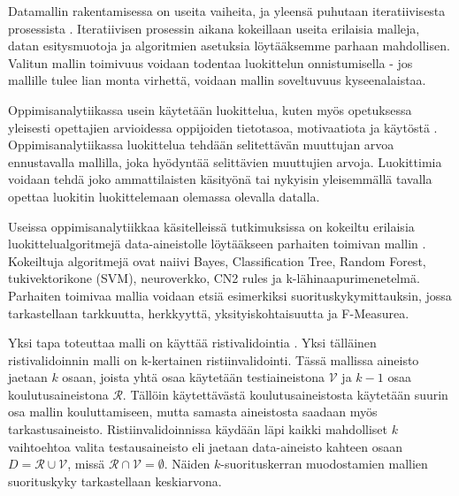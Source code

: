 Datamallin rakentamisessa on useita vaiheita, ja yleensä puhutaan iteratiivisesta prosessista \citep{hamalainenClassifiersEducationalData2010}. Iteratiivisen prosessin aikana kokeillaan useita erilaisia malleja, datan esitysmuotoja ja algoritmien asetuksia löytääksemme parhaan mahdollisen. Valitun mallin toimivuus voidaan todentaa luokittelun onnistumisella - jos mallille tulee lian monta virhettä, voidaan mallin soveltuvuus kyseenalaistaa.

Oppimisanalytiikassa usein käytetään luokittelua, kuten myös opetuksessa yleisesti opettajien arvioidessa oppijoiden tietotasoa, motivaatiota ja käytöstä \citep{hamalainenClassifiersEducationalData2010}. Oppimisanalytiikassa luokittelua tehdään selitettävän muuttujan arvoa ennustavalla mallilla, joka hyödyntää selittävien muuttujien arvoja. Luokittimia voidaan tehdä joko ammattilaisten käsityönä tai nykyisin yleisemmällä tavalla opettaa luokitin luokittelemaan olemassa olevalla datalla.

Useissa oppimisanalytiikkaa käsitelleissä tutkimuksissa on kokeiltu erilaisia luokittelualgoritmejä data-aineistolle löytääkseen parhaiten toimivan mallin \citep{akcapinarUsingLearningAnalytics2019}. Kokeiltuja algoritmejä ovat naiivi Bayes, Classification Tree, Random Forest, tukivektorikone (SVM), neuroverkko, CN2 rules ja k-lähinaapurimenetelmä. Parhaiten toimivaa mallia voidaan etsiä esimerkiksi suorituskykymittauksin, jossa tarkastellaan tarkkuutta, herkkyyttä, yksityiskohtaisuutta ja F-Measurea.

Yksi tapa toteuttaa malli on käyttää ristivalidointia \citep{deisenrothMathematicsMachineLearning2020}. Yksi tälläinen ristivalidoinnin malli on k-kertainen ristiinvalidointi. Tässä mallissa aineisto jaetaan $k$ osaan, joista yhtä osaa käytetään testiaineistona $\mathcal{V}$ ja $k-1$ osaa koulutusaineistona $\mathcal{R}$. Tällöin käytettävästä koulutusaineistosta käytetään suurin osa mallin kouluttamiseen, mutta samasta aineistosta saadaan myös tarkastusaineisto. Ristiinvalidoinnissa käydään läpi kaikki mahdolliset $k$ vaihtoehtoa valita testausaineisto eli jaetaan data-aineisto kahteen osaan $D = \mathcal{R} \cup \mathcal{V}$, missä $\mathcal{R} \cap \mathcal{V} = \emptyset$. Näiden $k$-suorituskerran muodostamien mallien suorituskyky tarkastellaan keskiarvona.

